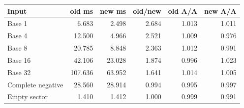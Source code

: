 \begin{center}
\small
\begin{tabular}{lrrrrr}
\toprule
Input & old ms & new ms & old/new & old A/A & new A/A\\
\midrule
Base 1 & 6.683 & 2.498 & 2.684 & 1.013 & 1.011\\
Base 4 & 12.500 & 4.966 & 2.521 & 1.009 & 0.976\\
Base 8 & 20.785 & 8.848 & 2.363 & 1.012 & 0.991\\
Base 16 & 42.106 & 23.028 & 1.874 & 0.996 & 1.023\\
Base 32 & 107.636 & 63.952 & 1.641 & 1.014 & 1.005\\
Complete negative & 28.560 & 28.914 & 0.994 & 0.995 & 0.997\\
Empty sector & 1.410 & 1.412 & 1.000 & 0.999 & 0.991\\
\bottomrule
\end{tabular}
\end{center}
